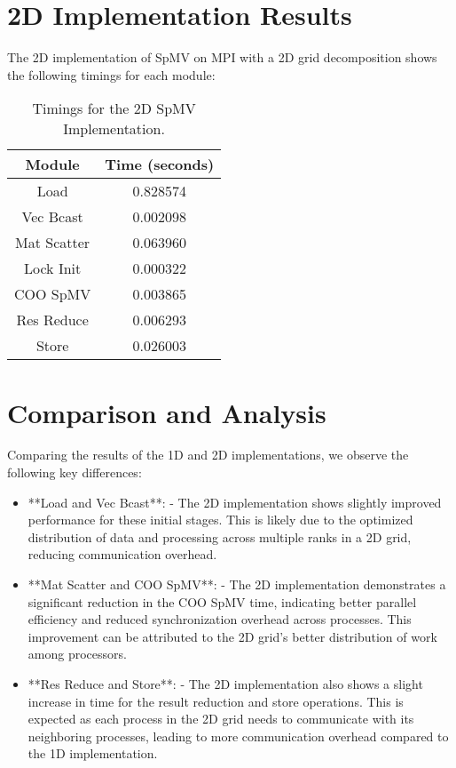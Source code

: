 \documentclass{article}
\begin{document}
\section{2D Implementation Results}
The 2D implementation of SpMV on MPI with a 2D grid decomposition shows the following timings for each module:
\\
\begin{table}[h!]
\centering
\begin{tabular}{|c|c|}
\hline
\textbf{Module} & \textbf{Time (seconds)} \\
\hline
Load & 0.828574 \\
Vec Bcast & 0.002098 \\
Mat Scatter & 0.063960 \\
Lock Init & 0.000322 \\
COO SpMV & 0.003865 \\
Res Reduce & 0.006293 \\
Store & 0.026003 \\
\hline
\end{tabular}
\caption{Timings for the 2D SpMV Implementation.}
\label{tab:2d_results}
\end{table}

\section{Comparison and Analysis}
Comparing the results of the 1D and 2D implementations, we observe the following key differences:

\begin{itemize}
\item **Load and Vec Bcast**:
  - The 2D implementation shows slightly improved performance for these initial stages. This is likely due to the optimized distribution of data and processing across multiple ranks in a 2D grid, reducing communication overhead.
  
\item **Mat Scatter and COO SpMV**:
  - The 2D implementation demonstrates a significant reduction in the COO SpMV time, indicating better parallel efficiency and reduced synchronization overhead across processes. This improvement can be attributed to the 2D grid's better distribution of work among processors.
  
\item **Res Reduce and Store**:
  - The 2D implementation also shows a slight increase in time for the result reduction and store operations. This is expected as each process in the 2D grid needs to communicate with its neighboring processes, leading to more communication overhead compared to the 1D implementation.
\end{itemize}
\end{document}
